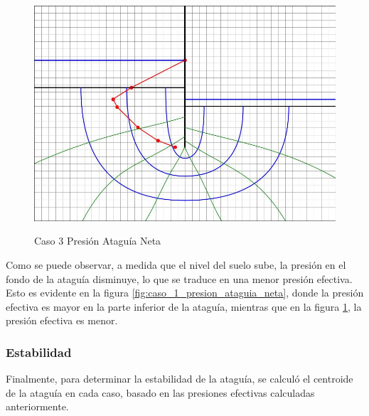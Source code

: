 \begin{figure}[H]
    \begin{minipage}{0.32\textwidth}
        \centering
        \includegraphics[width=\textwidth]{GRAFICOS/caso_3_presion_ataguia_neta.jpg}
        \caption{Caso 3 Presión Ataguía Neta}
        \label{fig:caso_3_presion_ataguia_neta}
    \end{minipage}
\end{figure}

Como se puede observar, a medida que el nivel del suelo sube, la presión en el fondo de la ataguía disminuye, lo que se traduce en una menor presión efectiva. Esto es evidente en la figura \ref{fig:caso_1_presion_ataguia_neta}, donde la presión efectiva es mayor en la parte inferior de la ataguía, mientras que en la figura \ref{fig:caso_3_presion_ataguia_neta}, la presión efectiva es menor.

\subsubsection{Estabilidad}
Finalmente, para determinar la estabilidad de la ataguía, se calculó el centroide de la ataguía en cada caso, basado en las presiones efectivas calculadas anteriormente.

